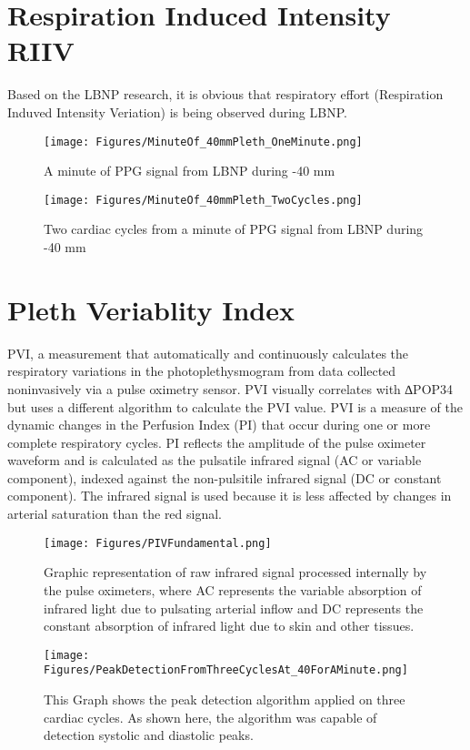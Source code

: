 \documentclass[twocolumn]{cinc}
\begin{document}
\section{Respiration Induced Intensity RIIV}
Based on the LBNP research, it is obvious that respiratory effort (Respiration Induved Intensity Veriation) is being observed during LBNP.
\begin{figure}[h!]
\centering
\texttt{[image: Figures/MinuteOf\_40mmPleth\_OneMinute.png]}
\caption{A minute of PPG signal from LBNP during -40 mm}
\label{fig:kian}
\end{figure}
\begin{figure}[h!]
\centering
\texttt{[image: Figures/MinuteOf\_40mmPleth\_TwoCycles.png]}
\caption{Two cardiac cycles from a minute of PPG signal from LBNP during -40 mm}
\label{fig:kian}
\end{figure}



\section{Pleth Veriablity Index}

PVI, a measurement  that automatically and continuously calculates the respiratory variations in the photoplethysmogram from data collected noninvasively via a pulse oximetry sensor. PVI visually correlates with ∆POP34 but uses a different algorithm to calculate the PVI value. PVI is a measure of the dynamic changes in the Perfusion Index (PI) that occur during one or more complete respiratory cycles. PI reflects the amplitude of the pulse oximeter waveform and is calculated as the pulsatile infrared signal (AC or variable component), indexed against the non-pulsitile infrared signal (DC or constant component). The infrared signal is used because it is less affected by changes in arterial saturation than the red signal.

\begin{figure}[h!]
\centering
\texttt{[image: Figures/PIVFundamental.png]}
\caption{Graphic representation of raw infrared signal processed internally by the pulse oximeters, where AC represents the variable absorption of infrared light due to pulsating arterial inflow and DC represents the constant absorption of infrared light due to skin and other tissues.}
\label{fig:PIV}
\end{figure}

\begin{figure}[h!]
\centering
\texttt{[image: Figures/PeakDetectionFromThreeCyclesAt\_40ForAMinute.png]}
\caption{This Graph shows the peak detection algorithm applied on three cardiac cycles. As shown here, the algorithm was capable of detection systolic and diastolic peaks.}
\label{fig:PIV}
\end{figure}
\end{document}
